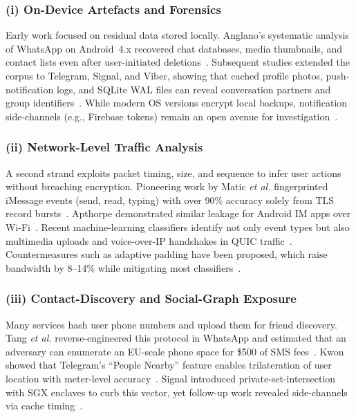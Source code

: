 \documentclass[a4paper,12pt]{report}
\begin{document}
\subsubsection*{(i) On-Device Artefacts and Forensics}
Early work focused on residual data stored locally. Anglano’s systematic analysis of WhatsApp on Android~4.x recovered chat databases, media thumbnails, and contact lists even after user-initiated deletions~\cite{anglano2015whatsapp}. Subsequent studies extended the corpus to Telegram, Signal, and Viber, showing that cached profile photos, push-notification logs, and SQLite WAL files can reveal conversation partners and group identifiers~\cite{moltchanov2018telegram, obermeier2018signal}. While modern OS versions encrypt local backups, notification side-channels (e.g., Firebase tokens) remain an open avenue for investigation~\cite{berezowski2020push}.

\subsubsection*{(ii) Network-Level Traffic Analysis}
A second strand exploits packet timing, size, and sequence to infer user actions without breaching encryption. Pioneering work by Matic \emph{et al.} fingerprinted iMessage events (send, read, typing) with over 90\% accuracy solely from TLS record bursts~\cite{matic2015iMessage}. Apthorpe demonstrated similar leakage for Android IM apps over Wi-Fi~\cite{apthorpe2018smart}. Recent machine-learning classifiers identify not only event types but also multimedia uploads and voice-over-IP handshakes in QUIC traffic~\cite{lee2023quic}. Countermeasures such as adaptive padding have been proposed, which raise bandwidth by 8–14\% while mitigating most classifiers~\cite{poblete2021defence}.

\subsubsection*{(iii) Contact-Discovery and Social-Graph Exposure}
Many services hash user phone numbers and upload them for friend discovery. Tang \emph{et al.} reverse-engineered this protocol in WhatsApp and estimated that an adversary can enumerate an EU-scale phone space for \$500 of SMS fees~\cite{tang2020whatsappHash}. Kwon showed that Telegram’s “People Nearby” feature enables trilateration of user location with meter-level accuracy~\cite{kwon2021telegram}. Signal introduced private-set-intersection with SGX enclaves to curb this vector, yet follow-up work revealed side-channels via cache timing~\cite{marforio2022psi}.
\end{document}
